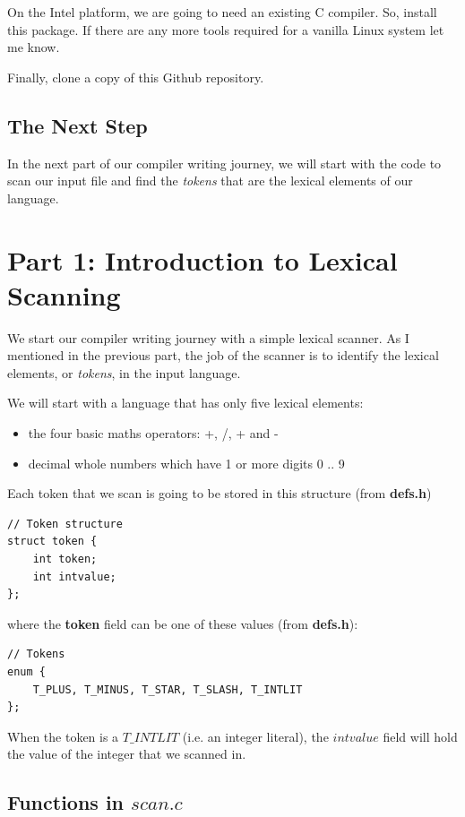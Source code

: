 \documentclass[a4paper,12pt]{article}
\begin{document}
On the Intel platform, we are going to need an existing C compiler. So, install this package.
If there are any more tools required for a vanilla Linux system let me know.

Finally, clone a copy of this Github repository.

\subsection{The Next Step}

In the next part of our compiler writing journey, we will start with the code to scan our input file and find the \textit{tokens} that are the lexical elements of our language.

\section{Part 1: Introduction to Lexical Scanning}

We start our compiler writing journey with a simple lexical scanner. As I mentioned in the previous part, the job of the scanner is to identify the lexical elements, or \textit{tokens}, in the input language.

We will start with a language that has only five lexical elements:
\begin{itemize}
    \item the four basic maths operators: {+}, {/}, {+} and {-}
    \item decimal whole numbers which have 1 or more digits 0 .. 9
\end{itemize}

Each token that we scan is going to be stored in this structure (from \textbf{defs.h})

\begin{lstlisting}
// Token structure
struct token {
    int token;
    int intvalue;
};
\end{lstlisting}

where the \textbf{token} field can be one of these values (from \textbf{defs.h}):

\begin{lstlisting}
// Tokens
enum {
    T_PLUS, T_MINUS, T_STAR, T_SLASH, T_INTLIT
};
\end{lstlisting}

When the token is a $T\_INTLIT$ (i.e. an integer literal), the $intvalue$ field will hold the value of the integer that we scanned in.

\subsection{Functions in $scan.c$}
\end{document}
